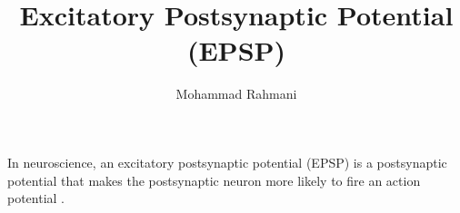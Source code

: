 \documentclass[a4paper]{article}
\title{Excitatory Postsynaptic Potential (EPSP)}
\date{}
\author{Mohammad Rahmani}
\begin{document}
\maketitle
    In neuroscience, an excitatory postsynaptic potential (EPSP) is a postsynaptic potential that makes the postsynaptic neuron more likely to fire an action potential .
    
    
\end{document}
